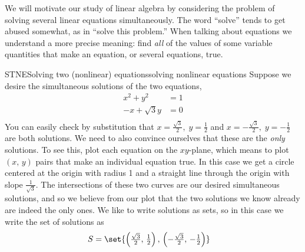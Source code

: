 %
We will motivate our study of linear algebra by considering the problem of solving several linear equations simultaneously.  The word ``solve'' tends to get abused somewhat, as in ``solve this problem.''  When talking about equations we understand a more precise meaning:  find {\em all} of the values of some variable quantities that make an equation, or several equations, true.
%
%
\begin{example}{STNE}{Solving two (nonlinear) equations}{solving nonlinear equations}
Suppose we desire the simultaneous solutions of the two equations,
%
\begin{align*}
x^2+y^2&=1\\
-x+\sqrt{3}y&=0\\
\end{align*}
%
You can easily check by substitution that $x=\tfrac{\sqrt{3}}{2},\;y=\tfrac{1}{2}$ and $x=-\tfrac{\sqrt{3}}{2},\;y=-\tfrac{1}{2}$ are both solutions.  We need to also convince ourselves that these are the {\em only} solutions.  To see this, plot each equation on the $xy$-plane, which means to plot $(x,\,y)$ pairs that make an individual equation true.  In this case we get a circle centered at the origin with radius 1 and a straight line through the origin with slope $\tfrac{1}{\sqrt{3}}$.  The intersections of these two curves are our desired simultaneous solutions, and so we believe from our plot that the two solutions we know already are indeed the only ones.  We like to write solutions as sets, so in this case we write the set of solutions as
%
\begin{align*}
S&=\set{\left(\tfrac{\sqrt{3}}{2},\,\tfrac{1}{2}\right),\,\left(-\tfrac{\sqrt{3}}{2},\,-\tfrac{1}{2}\right)}
\end{align*}
%
\end{example}
%

